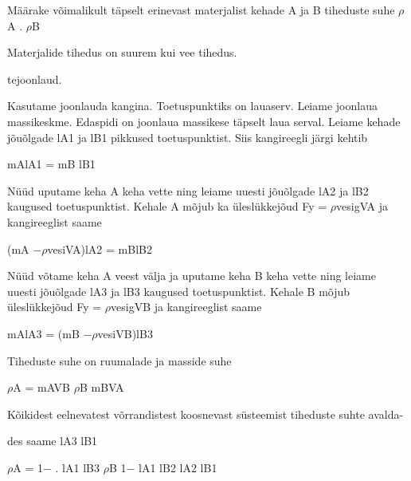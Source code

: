 
Määrake võimalikult täpselt erinevast materjalist kehade A ja B tiheduste suhe $\rho$A . $\rho$B

Materjalide tihedus on suurem kui vee tihedus.

tejoonlaud.

\hint

\solu
Kasutame joonlauda kangina. Toetuspunktiks on lauaserv. Leiame joonlaua massikeskme. Edaspidi on joonlaua massikese täpselt laua serval. Leiame kehade jõuõlgade lA1 ja lB1 pikkused toetuspunktist. Siis kangireegli järgi kehtib

mAlA1 = mB lB1

Nüüd uputame keha A keha vette ning leiame uuesti jõuõlgade lA2 ja lB2 kaugused toetuspunktist. Kehale A mõjub ka üleslükkejõud Fy = $\rho$vesigVA ja kangireeglist saame

(mA $- \rho$vesiVA)lA2 = mBlB2

Nüüd võtame keha A veest välja ja uputame keha B keha vette ning leiame uuesti jõuõlgade lA3 ja lB3 kaugused toetuspunktist. Kehale B mõjub üleslükkejõud Fy = $\rho$vesigVB ja kangireeglist saame

mAlA3 = (mB $- \rho$vesiVB)lB3

Tiheduste suhe on ruumalade ja masside suhe

$\rho$A = mAVB $\rho$B mBVA

Kõikidest eelnevatest võrrandistest koosnevast süsteemist tiheduste suhte avalda-

des saame lA3 lB1

$\rho$A = 1$-$ . lA1 lB3 $\rho$B 1$-$ lA1 lB2 lA2 lB1
\probend
